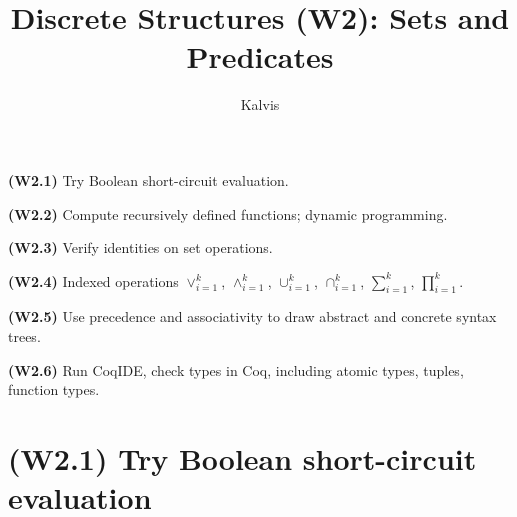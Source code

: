 \documentclass[jou]{apa6}
\title{Discrete Structures (W2): Sets and Predicates}
\author{Kalvis}
\affiliation{RBS}
\begin{document}
\maketitle


{\bf (W2.1)} Try Boolean short-circuit evaluation.

{\bf (W2.2)} Compute recursively defined functions; dynamic programming.

{\bf (W2.3)} Verify identities on set operations.

{\bf (W2.4)} Indexed operations $\vee_{i=1}^{k}$, $\wedge_{i=1}^{k}$, 
$\cup_{i=1}^{k}$, $\cap_{i=1}^{k}$, $\sum_{i=1}^{k}$, 
$\prod_{i=1}^{k}$.

{\bf (W2.5)} Use precedence and associativity to draw abstract and concrete syntax trees.

{\bf (W2.6)} Run CoqIDE, check types in Coq, including atomic types, 
tuples, function types.



\section{(W2.1) Try Boolean short-circuit evaluation}
\end{document}

